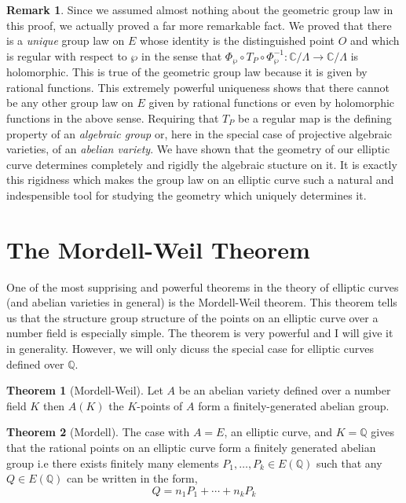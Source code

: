 \documentclass{article}
\newcommand{\Q}{\mathbb{Q}}
\newcommand{\C}{\mathbb{C}}
\theoremstyle{definition}
\newtheorem{theorem}{Theorem}[section]
\newtheorem{remark}{Remark}[section]
\begin{document}
\begin{remark}
Since we assumed almost nothing about the geometric group law in this proof, we actually proved a far more remarkable fact. We proved that there is a \textit{unique} group law on $E$ whose identity is the distinguished point $O$ and which is regular with respect to $\wp$ in the sense that $\Phi_{\wp} \circ T_P \circ \Phi_{\wp}^{-1} : \C / \Lambda \to \C / \Lambda$ is holomorphic. This is true of the geometric group law because it is given by rational functions. This extremely powerful uniqueness shows that there cannot be any other group law on $E$ given by rational functions or even by holomorphic functions in the above sense. Requiring that $T_P$ be a regular map is the defining property of an \textit{algebraic group} or, here in the special case of projective algebraic varieties, of an \textit{abelian variety}. We have shown that the geometry of our elliptic curve determines completely and rigidly the algebraic stucture on it. It is exactly this rigidness which makes the group law on an elliptic curve such a natural and indespensible tool for studying the geometry which uniquely determines it. 
\end{remark}


\section{The Mordell-Weil Theorem}

One of the most supprising and powerful theorems in the theory of elliptic curves (and abelian varieties in general) is the Mordell-Weil theorem. This theorem tells us that the structure group structure of the points on an elliptic curve over a number field is especially simple. The theorem is very powerful and I will give it in generality. However, we will only dicuss the special case for elliptic curves defined over $\Q$.

\begin{theorem}[Mordell-Weil]
Let $A$ be an abelian variety defined over a number field $K$ then $A(K)$ the $K$-points of $A$  form a finitely-generated abelian group.
\end{theorem} 

\begin{theorem}[Mordell] 
The case with $A = E$, an elliptic curve, and $K = \Q$ gives that the rational points on an elliptic curve form a finitely generated abelian group i.e there exists finitely many elements $P_1, \dots, P_k \in E(\Q)$ such that any $Q \in E(\Q)$ can be written in the form,
\[ Q = n_1 P_1 + \cdots + n_k P_k \] 
\end{theorem}
\end{document}

